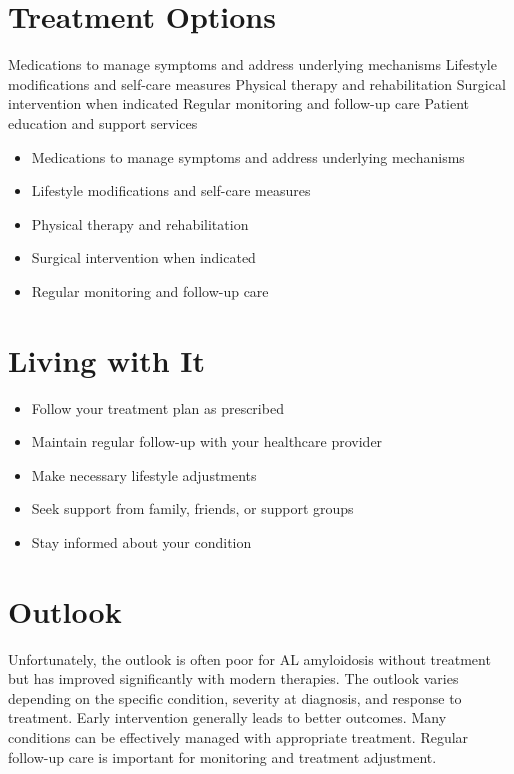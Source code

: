 \section{Treatment Options}
Medications to manage symptoms and address underlying mechanisms Lifestyle modifications and self-care measures Physical therapy and rehabilitation Surgical intervention when indicated Regular monitoring and follow-up care Patient education and support services

\begin{itemize}[noitemsep]
  \item Medications to manage symptoms and address underlying mechanisms
  \item Lifestyle modifications and self-care measures
  \item Physical therapy and rehabilitation
  \item Surgical intervention when indicated
  \item Regular monitoring and follow-up care
\end{itemize}
\section{Living with It}
\begin{itemize}[noitemsep]
  \item Follow your treatment plan as prescribed
  \item Maintain regular follow-up with your healthcare provider
  \item Make necessary lifestyle adjustments
  \item Seek support from family, friends, or support groups
  \item Stay informed about your condition
\end{itemize}
\section{Outlook}
Unfortunately, the outlook is often poor for AL amyloidosis without treatment but has improved significantly with modern therapies. The outlook varies depending on the specific condition, severity at diagnosis, and response to treatment. Early intervention generally leads to better outcomes. Many conditions can be effectively managed with appropriate treatment. Regular follow-up care is important for monitoring and treatment adjustment.
